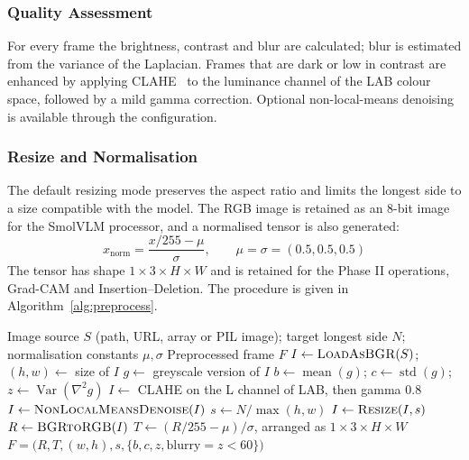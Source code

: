 \subsubsection{Quality Assessment}
For every frame the brightness, contrast and blur are calculated; blur is estimated from the variance of the Laplacian. Frames that are dark or low in contrast are enhanced by applying CLAHE~\cite{zuiderveld1994clahe} to the luminance channel of the LAB colour space, followed by a mild gamma correction. Optional non-local-means denoising is available through the configuration.

\subsubsection{Resize and Normalisation}
The default resizing mode preserves the aspect ratio and limits the longest side to a size compatible with the model. The RGB image is retained as an 8-bit image for the SmolVLM processor, and a normalised tensor is also generated:
\begin{equation}
  x_{\text{norm}} = \frac{x/255 - \mu}{\sigma}, \qquad
  \mu = \sigma = (0.5, 0.5, 0.5)
  \label{eq:norm}
\end{equation}
The tensor has shape $1 \times 3 \times H \times W$ and is retained for the Phase II operations, Grad-CAM and Insertion--Deletion. The procedure is given in Algorithm~\ref{alg:preprocess}.

\begin{algorithm}[H]
\caption{Input Preprocessing}
\label{alg:preprocess}
\begin{algorithmic}[1]
\Require Image source $S$ (path, URL, array or PIL image); target longest side $N$; normalisation constants $\mu,\sigma$
\Ensure Preprocessed frame $F$
\State $I \gets \textsc{LoadAsBGR}(S)$;\; $(h,w) \gets$ size of $I$
\State $g \gets$ greyscale version of $I$
\State $b \gets \operatorname{mean}(g)$;\; $c \gets \operatorname{std}(g)$;\; $z \gets \operatorname{Var}(\nabla^2 g)$ 
  \State $I \gets$ CLAHE on the L channel of LAB, then gamma $0.8$
\EndIf
{}
  \State $I \gets \textsc{NonLocalMeansDenoise}(I)$
\EndIf
\State $s \gets N / \max(h,w)$
  \State $I \gets \textsc{Resize}(I, s)$ 
\EndIf
\State $R \gets \textsc{BGRtoRGB}(I)$
\State $T \gets (R/255 - \mu)/\sigma$, arranged as $1 \times 3 \times H \times W$
\State \Return $F = \big(R, T, (w,h), s, \{b, c, z, \text{blurry} = z < 60\}\big)$
\end{algorithmic}
\end{algorithm}

